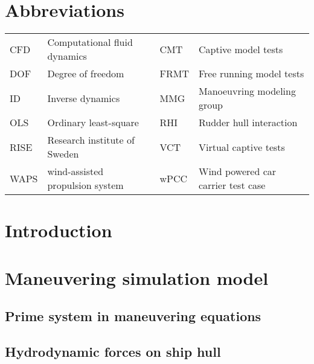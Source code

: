 \documentclass[preprint,11pt,authoryear]{elsarticle}
\begin{document}
\section*{Abbreviations}
\label{sec:introduction}
\begin{table}[h]
    \centering
    \scriptsize
    \label{tab:abbreviations}
    \begin{tabular}{l l l l}

    CFD & Computational fluid dynamics & CMT & Captive model tests \\
    
    DOF & Degree of freedom &  FRMT & Free running model tests \\
    ID & Inverse dynamics &  MMG & Manoeuvring modeling group \\
    OLS & Ordinary least-square &  RHI & Rudder hull interaction \\
    RISE & Research institute of Sweden &  VCT & Virtual captive tests \\
    WAPS & wind-assisted propulsion system &  wPCC & Wind powered car carrier test case\\
    \end{tabular}
        
\end{table}
\FloatBarrier

\section{Introduction}
\label{sec:introduction}


\section{Maneuvering simulation model} \label{sec:model}

%

\subsection{Prime system in maneuvering equations}
\label{sec:prime_system}


\FloatBarrier
\subsection{Hydrodynamic forces on ship hull}

\end{document}
